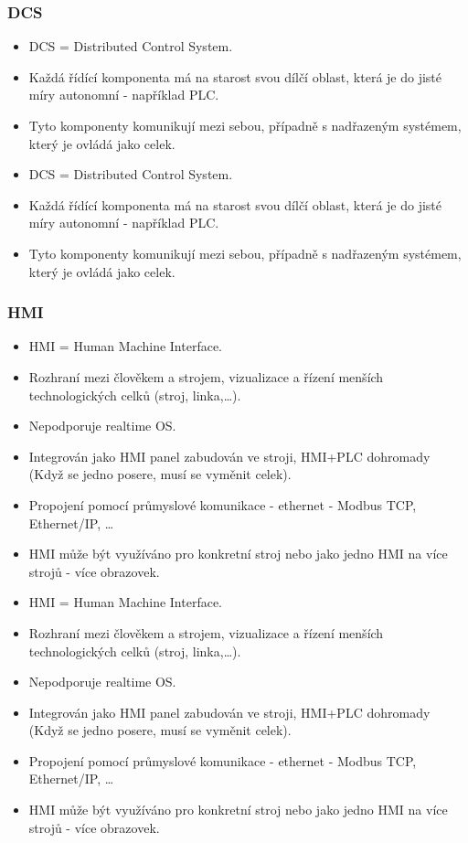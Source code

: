 \subsubsection*{DCS}
\begin{itemize}
  \item DCS = Distributed Control System.
  \item Každá řídící komponenta má na starost svou dílčí oblast, která je do jisté míry autonomní - například PLC.
  \item Tyto komponenty komunikují mezi sebou, případně s nadřazeným systémem, který je ovládá jako celek.
    \item DCS = Distributed Control System.
    \item Každá řídící komponenta má na starost svou dílčí oblast, která je do jisté míry autonomní - například PLC.
    \item Tyto komponenty komunikují mezi sebou, případně s nadřazeným systémem, který je ovládá jako celek.
\end{itemize}

\subsubsection*{HMI}
\begin{itemize}
  \item HMI = Human Machine Interface.
  \item Rozhraní mezi člověkem a strojem, vizualizace a řízení menších technologických celků (stroj, linka,\dots).
  \item Nepodporuje realtime OS.
  \item Integrován jako HMI panel zabudován ve stroji, HMI+PLC dohromady (Když se jedno posere, musí se vyměnit celek).
  \item Propojení pomocí průmyslové komunikace - ethernet - Modbus TCP, Ethernet/IP, \dots
  \item HMI může být využíváno pro konkretní stroj nebo jako jedno HMI na více strojů - více obrazovek.
    \item HMI = Human Machine Interface.
    \item Rozhraní mezi člověkem a strojem, vizualizace a řízení menších technologických celků (stroj, linka,\dots).
    \item Nepodporuje realtime OS.
    \item Integrován jako HMI panel zabudován ve stroji, HMI+PLC dohromady (Když se jedno posere, musí se vyměnit celek).
    \item Propojení pomocí průmyslové komunikace - ethernet - Modbus TCP, Ethernet/IP, \dots
    \item HMI může být využíváno pro konkretní stroj nebo jako jedno HMI na více strojů - více obrazovek.
\end{itemize}

